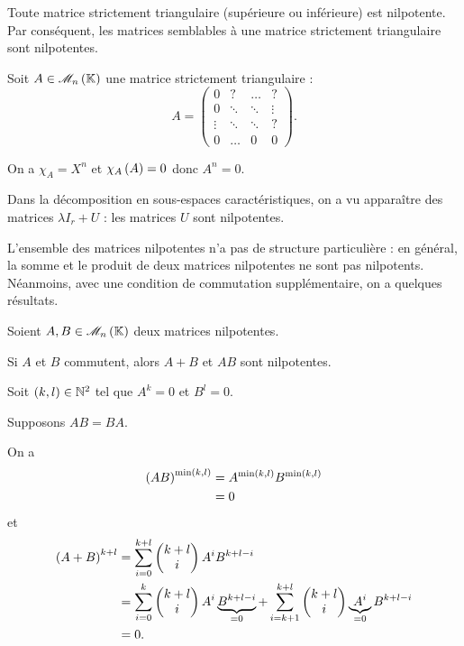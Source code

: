 \begin{prop}
Toute matrice strictement triangulaire (supérieure ou inférieure) est nilpotente. Par conséquent, les matrices semblables à une matrice strictement triangulaire sont nilpotentes.
\end{prop}

\begin{dem}
Soit \(A\in\M{n}\) une matrice strictement triangulaire : \[A=\begin{pmatrix}
0 & ? & \dots & ? \\
0 & \ddots & \ddots & \vdots \\
\vdots & \ddots & \ddots & ? \\
0 & \dots & 0 & 0
\end{pmatrix}.\]

On a \(\chi_A=X^n\) et \(\chi_A\paren{A}=0\) donc \(A^n=0\).
\end{dem}

Dans la décomposition en sous-espaces caractéristiques, on a vu apparaître des matrices \(\lambda I_r+U\) : les matrices \(U\) sont nilpotentes.

L'ensemble des matrices nilpotentes n'a pas de structure particulière : en général, la somme et le produit de deux matrices nilpotentes ne sont pas nilpotents. Néanmoins, avec une condition de commutation supplémentaire, on a quelques résultats.

\begin{prop}
Soient \(A,B\in\M{n}\) deux matrices nilpotentes.

Si \(A\) et \(B\) commutent, alors \(A+B\) et \(AB\) sont nilpotentes.
\end{prop}

\begin{dem}
Soit \(\paren{k,l}\in\N^2\) tel que \(A^k=0\) et \(B^l=0\).

Supposons \(AB=BA\).

On a \[\begin{aligned}
\paren{AB}^{\min\paren{k,l}}&=A^{\min\paren{k,l}}B^{\min\paren{k,l}} \\
&=0
\end{aligned}\] et \[\begin{aligned}
\paren{A+B}^{k+l}&=\sum_{i=0}^{k+l}\binom{i}{k+l}A^iB^{k+l-i} \\
&=\sum_{i=0}^k\binom{i}{k+l}A^i\underbrace{B^{k+l-i}}_{=0}+\sum_{i=k+1}^{k+l}\binom{i}{k+l}\underbrace{A^i}_{=0}B^{k+l-i} \\
&=0.
\end{aligned}\]
\end{dem}


